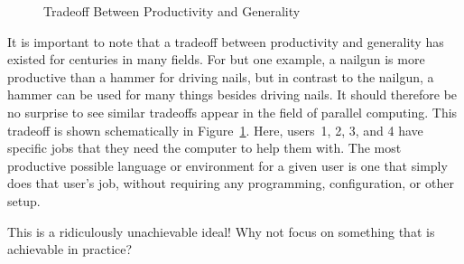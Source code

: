 \begin{figure}[tb]
\begin{center}
\end{center}
\caption{Tradeoff Between Productivity and Generality}
\label{fig:intro:Tradeoff Between Productivity and Generality}
\end{figure}

It is important to note that a tradeoff between productivity and
generality has existed for centuries in many fields.
For but one example, a nailgun is more productive than a hammer for
driving nails, but in contrast to the nailgun, a hammer can be used for
many things besides driving nails.
It should therefore be no surprise to see similar tradeoffs
appear in the field of parallel computing.
This tradeoff is shown schematically in
Figure~\ref{fig:intro:Tradeoff Between Productivity and Generality}.
Here, users~1, 2, 3, and 4 have specific jobs that they need the computer
to help them with.
The most productive possible language or environment for a given user is one
that simply does that user's job, without requiring any programming,
configuration, or other setup.

\QuickQuiz{}
	This is a ridiculously unachievable ideal!
	Why not focus on something that is achievable in practice?
 \QuickQuizEnd

